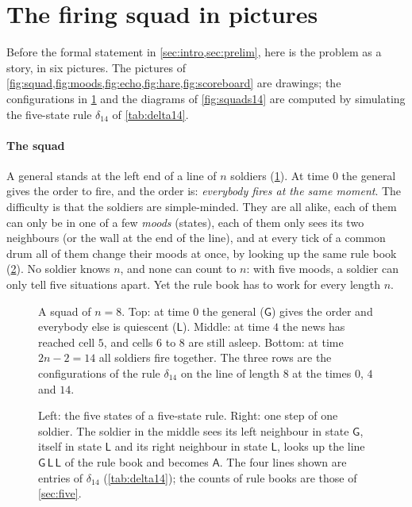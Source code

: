 \section*{The firing squad in pictures}\label{sec:pictures}

Before the formal statement in \cref{sec:intro,sec:prelim}, here is the
problem as a story, in six pictures. The pictures of
\cref{fig:squad,fig:moods,fig:echo,fig:hare,fig:scoreboard} are drawings; the
configurations in \cref{fig:squad} and the diagrams of \cref{fig:squads14}
are computed by simulating the five-state rule $\delta_{14}$ of
\cref{tab:delta14}.

\paragraph{The squad}
A general stands at the left end of a line of $n$ soldiers
(\cref{fig:squad}). At time $0$ the general gives the order to fire, and
the order is: \emph{everybody fires at the same moment}. The difficulty is
that the soldiers are simple-minded. They are all alike, each of them can
only be in one of a few \emph{moods} (states), each of them only sees its
two neighbours (or the wall at the end of the line), and at every tick of a
common drum all of them change their moods at once, by looking up the
same rule book (\cref{fig:moods}). No soldier knows $n$, and none can count
to $n$: with five moods, a soldier can only tell five situations apart. Yet the rule book has to work for every length $n$.

\begin{figure}[htbp]
\centering

\caption{A squad of $n=8$. Top: at time $0$ the general ($\mathsf G$)
gives the order and everybody else is quiescent ($\mathsf L$). Middle: at
time $4$ the news has reached cell $5$, and cells $6$ to $8$ are still
asleep. Bottom: at time $2n-2=14$ all soldiers fire together. The three
rows are the configurations of the rule $\delta_{14}$ on the line of length
$8$ at the times $0$, $4$ and $14$.}
\label{fig:squad}
\end{figure}

\begin{figure}[htbp]
\centering

\caption{Left: the five states of a five-state rule. Right: one step of
one soldier. The soldier in the middle sees its left neighbour in state
$\mathsf G$, itself in state $\mathsf L$ and its right neighbour in state
$\mathsf L$, looks up the line $\mathsf G\,\mathsf L\,\mathsf L$ of the
rule book and becomes $\mathsf A$. The four lines shown are entries of
$\delta_{14}$ (\cref{tab:delta14}); the counts of rule books are those of
\cref{sec:five}.}
\label{fig:moods}
\end{figure}

